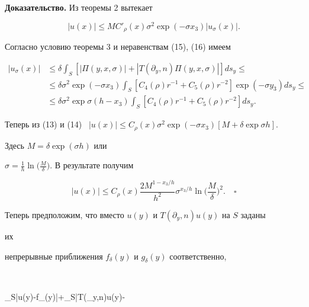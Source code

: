  


 


{\bf Доказательство.} Из теоремы 2 вытекает 


$$ 


|u(x)|\le M C'_\rho(x)\sigma^2\exp(-\sigma x_3) 


|u_\sigma(x)|. 


$$ 


Согласно условию теоремы 3 и неравенствам (15), (16) имеем 


\begin{align*} 


|u_\sigma(x)|&\le \delta\int_S[|\Pi(y,x,\sigma)|+ 


|T(\partial_y,n)\Pi(y,x,\sigma)|]ds_y \le \\ 


% 


&\le \delta\sigma^2\exp(-\sigma x_3)\int_S[C_4(\rho)r^{-1} 


+C_5(\rho)r^{-2}]\exp(-\sigma y_3)ds_y \le \\ 


% 


&\le \delta\sigma^2\exp\sigma(h-x_3)\int_S[C_4(\rho)r^{-1}+ 


C_5(\rho)r^{-2}]ds_y. 


\end{align*} 


Теперь из (13) и (14) \ $|u(x)|\le C_\rho(x)\sigma^2\exp(-\sigma 


x_3)[M+\delta\exp\sigma h]$. 


Здесь $M=\delta\exp(\sigma h)$ или 


$\sigma=\frac{1}{h}\ln\big(\frac{M}{\delta}\big)$. В результате получим 


$$ 


|u(x)|\le C_\rho(x)\frac{2M^{1-x_3/h}}{h^2}\sigma^{x_3/h}\ln\bigg( 


\frac{M}{\delta}\bigg)^2.\quad\square 


$$ 


 


 


Теперь предположим, что вместо $u(y)$ и $T(\partial_y,n)u(y)$ на $S$ заданы 


их 


непрерывные приближения $f_\delta(y)$ и $g_\delta(y)$ соответственно, 


$$ 


\max_S|u(y)-f_\delta(y)|+\max_S|T(\partial_y,n)u(y)- 



